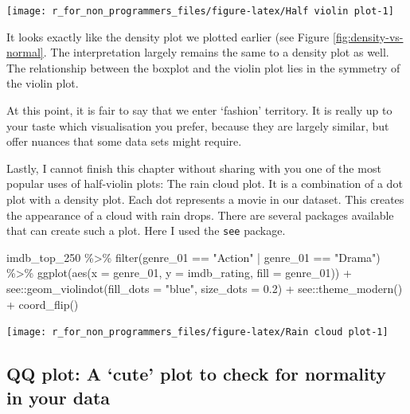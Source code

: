 \documentclass[
]{book}
\newenvironment{Shaded}{\begin{snugshade}}{\end{snugshade}}
\newcommand{\AttributeTok}[1]{\textcolor[rgb]{0.77,0.63,0.00}{#1}}
\newcommand{\FloatTok}[1]{\textcolor[rgb]{0.00,0.00,0.81}{#1}}
\newcommand{\FunctionTok}[1]{\textcolor[rgb]{0.00,0.00,0.00}{#1}}
\newcommand{\NormalTok}[1]{#1}
\newcommand{\SpecialCharTok}[1]{\textcolor[rgb]{0.00,0.00,0.00}{#1}}
\newcommand{\StringTok}[1]{\textcolor[rgb]{0.31,0.60,0.02}{#1}}
\begin{document}
\begin{center}\texttt{[image: r\_for\_non\_programmers\_files/figure-latex/Half violin plot-1]} \end{center}

It looks exactly like the density plot we plotted earlier (see Figure \ref{fig:density-vs-normal}. The interpretation largely remains the same to a density plot as well. The relationship between the boxplot and the violin plot lies in the symmetry of the violin plot.

At this point, it is fair to say that we enter `fashion' territory. It is really up to your taste which visualisation you prefer, because they are largely similar, but offer nuances that some data sets might require.

Lastly, I cannot finish this chapter without sharing with you one of the most popular uses of half-violin plots: The rain cloud plot. It is a combination of a dot plot with a density plot. Each dot represents a movie in our dataset. This creates the appearance of a cloud with rain drops. There are several packages available that can create such a plot. Here I used the \texttt{see} package.

\begin{Shaded}
\begin{Highlighting}[]
\NormalTok{imdb\_top\_250 }\SpecialCharTok{\%\textgreater{}\%}
  \FunctionTok{filter}\NormalTok{(genre\_01 }\SpecialCharTok{==} \StringTok{"Action"} \SpecialCharTok{|}\NormalTok{ genre\_01 }\SpecialCharTok{==} \StringTok{"Drama"}\NormalTok{) }\SpecialCharTok{\%\textgreater{}\%} 
  \FunctionTok{ggplot}\NormalTok{(}\FunctionTok{aes}\NormalTok{(}\AttributeTok{x =}\NormalTok{ genre\_01, }\AttributeTok{y =}\NormalTok{ imdb\_rating, }\AttributeTok{fill =}\NormalTok{ genre\_01)) }\SpecialCharTok{+} 
\NormalTok{  see}\SpecialCharTok{::}\FunctionTok{geom\_violindot}\NormalTok{(}\AttributeTok{fill\_dots =} \StringTok{"blue"}\NormalTok{, }\AttributeTok{size\_dots =} \FloatTok{0.2}\NormalTok{) }\SpecialCharTok{+}
\NormalTok{  see}\SpecialCharTok{::}\FunctionTok{theme\_modern}\NormalTok{() }\SpecialCharTok{+}
  \FunctionTok{coord\_flip}\NormalTok{()}
\end{Highlighting}
\end{Shaded}

\begin{center}\texttt{[image: r\_for\_non\_programmers\_files/figure-latex/Rain cloud plot-1]} \end{center}

\hypertarget{qq-plot}{%
\subsection{QQ plot: A `cute' plot to check for normality in your data}\label{qq-plot}}
\end{document}
